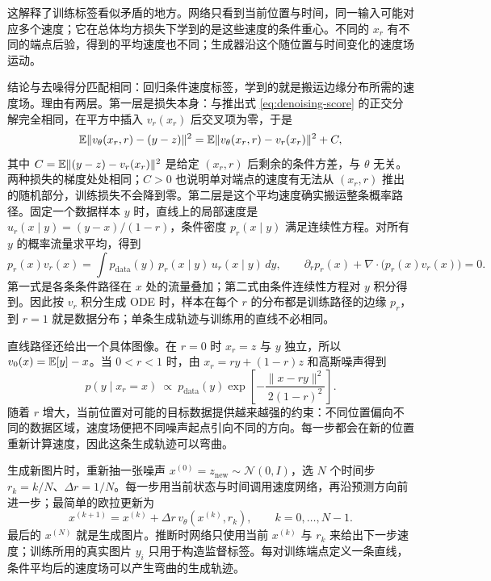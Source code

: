 这解释了训练标签看似矛盾的地方。网络只看到当前位置与时间，同一输入可能对应多个速度；它在总体均方损失下学到的是这些速度的条件重心。不同的 \(x_r\) 有不同的端点后验，得到的平均速度也不同；生成器沿这个随位置与时间变化的速度场运动。

结论与去噪得分匹配相同：回归条件速度标签，学到的就是搬运边缘分布所需的速度场。理由有两层。第一层是损失本身：与推出式 \eqref{eq:denoising-score} 的正交分解完全相同，在平方中插入 \(v_r(x_r)\) 后交叉项为零，于是
\begin{equation}
 \mathbb{E}\|v_\theta(x_r,r)-(y-z)\|^2
 =\mathbb{E}\|v_\theta(x_r,r)-v_r(x_r)\|^2+C,
 \label{eq:cfm-marginal-equivalence}
\end{equation}
其中 \(C=\mathbb{E}\|(y-z)-v_r(x_r)\|^2\) 是给定 \((x_r,r)\) 后剩余的条件方差，与 \(\theta\) 无关。两种损失的梯度处处相同；\(C>0\) 也说明单对端点的速度有无法从 \((x_r,r)\) 推出的随机部分，训练损失不会降到零。第二层是这个平均速度确实搬运整条概率路径。固定一个数据样本 \(y\) 时，直线上的局部速度是 \(u_r(x\mid y)=(y-x)/(1-r)\)，条件密度 \(p_r(x\mid y)\) 满足连续性方程。对所有 \(y\) 的概率流量求平均，得到
\begin{equation}
 p_r(x)v_r(x)
 =\int p_{\mathrm{data}}(y)\,p_r(x\mid y)\,u_r(x\mid y)\,dy,
 \qquad
 \partial_r p_r(x)+\nabla\cdot\bigl(p_r(x)v_r(x)\bigr)=0.
 \label{eq:flow-matching-marginal-flux}
\end{equation}
第一式是各条条件路径在 \(x\) 处的流量叠加；第二式由条件连续性方程对 \(y\) 积分得到。因此按 \(v_r\) 积分生成 ODE 时，样本在每个 \(r\) 的分布都是训练路径的边缘 \(p_r\)，到 \(r=1\) 就是数据分布；单条生成轨迹与训练用的直线不必相同。

直线路径还给出一个具体图像。在 \(r=0\) 时 \(x_r=z\) 与 \(y\) 独立，所以 \(v_0(x)=\mathbb{E}[y]-x\)。当 \(0<r<1\) 时，由 \(x_r=ry+(1-r)z\) 和高斯噪声得到
\begin{equation}
 p(y\mid x_r=x)\ \propto\ p_{\mathrm{data}}(y)
 \exp\!\left[-\frac{\|x-ry\|^2}{2(1-r)^2}\right].
 \label{eq:flow-matching-endpoint-posterior}
\end{equation}
随着 \(r\) 增大，当前位置对可能的目标数据提供越来越强的约束：不同位置偏向不同的数据区域，速度场便把不同噪声起点引向不同的方向。每一步都会在新的位置重新计算速度，因此这条生成轨迹可以弯曲。

生成新图片时，重新抽一张噪声 \(x^{(0)}=z_{\mathrm{new}}\sim\mathcal N(0,I)\)，选 \(N\) 个时间步 \(r_k=k/N\)、\(\Delta r=1/N\)。每一步用当前状态与时间调用速度网络，再沿预测方向前进一步；最简单的欧拉更新为
\begin{equation}
 x^{(k+1)}=x^{(k)}+\Delta r\,v_\theta(x^{(k)},r_k),
 \qquad k=0,\ldots,N-1.
 \label{eq:flow-matching-euler}
\end{equation}
最后的 \(x^{(N)}\) 就是生成图片。推断时网络只使用当前 \(x^{(k)}\) 与 \(r_k\) 来给出下一步速度；训练所用的真实图片 \(y_i\) 只用于构造监督标签。每对训练端点定义一条直线，条件平均后的速度场可以产生弯曲的生成轨迹。

